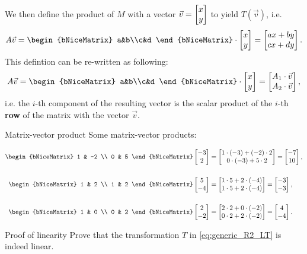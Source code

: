 We then define the product of $M$ with a vector $\vec{v}=\colvec{x;y}$ to yield $T \left( \vec{v} \right)$, i.e.
\begin{equation}
	A\vec{v} = \begin{bNiceMatrix} a&b\\c&d \end{bNiceMatrix} \cdot\colvec{x;y} = \colvec{ax+by;cx+dy}.
	\label{eq:matrix_vector_product}
\end{equation}
This defintion can be re-written as following:
\begin{equation}
	A\vec{v} = \begin{bNiceMatrix} a&b\\c&d \end{bNiceMatrix} \cdot\colvec{x;y} = \colvec{A_{1}\cdot\vec{v};A_{2}\cdot\vec{v}},
	\label{eq:matrix_vector_product_as_dot_product}
\end{equation}
i.e. the $i$-th component of the resulting vector is the scalar product of the $i$-th \textbf{row} of the matrix with the vector $\vec{v}$.

\begin{example}{Matrix-vector product}{}
	Some matrix-vector products:

	\begin{align*}
		\begin{bNiceMatrix}
			1 & -2 \\
			0 & 5
		\end{bNiceMatrix}\colvec{-3;2} &= \colvec{1\cdot(-3) + (-2)\cdot2;0\cdot(-3)+5\cdot2} = \colvec{-7;10},\\[5mm]
		\begin{bNiceMatrix}
			1 & 2 \\
			1 & 2
		\end{bNiceMatrix}\colvec{5;-4} &= \colvec{1\cdot5+2\cdot(-4);1\cdot5+2\cdot(-4)} = \colvec{-3;-3},\\[5mm]
		\begin{bNiceMatrix}
			1 & 0 \\
			0 & 2
		\end{bNiceMatrix}\colvec{2;-2} &= \colvec{2\cdot2+0\cdot(-2);0\cdot2+2\cdot(-2)} = \colvec{4;-4}.
	\end{align*}
\end{example}

\begin{challange}{Proof of linearity}{}
	Prove that the transformation $T$ in \autoref{eq:generic_R2_LT} is indeed linear.
\end{challange}

